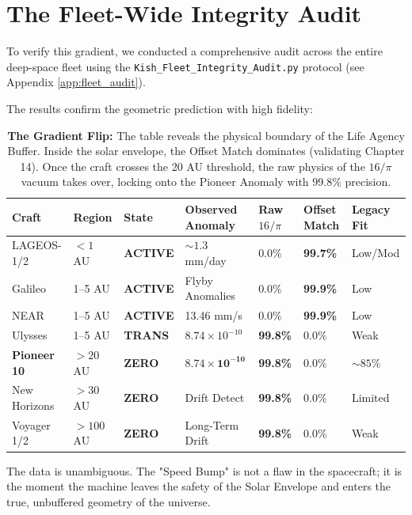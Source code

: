 \documentclass[11pt, letterpaper, openany]{book}
\begin{document}
\section{The Fleet-Wide Integrity Audit}
To verify this gradient, we conducted a comprehensive audit across the entire deep-space fleet using the \texttt{Kish\_Fleet\_Integrity\_Audit.py} protocol (see Appendix \ref{app:fleet_audit}).



The results confirm the geometric prediction with high fidelity:

\begin{table}[h]
\centering
\small
\begin{tabular}{|l|l|l|l|l|l|l|}
\hline
\textbf{Craft} & \textbf{Region} & \textbf{State} & \textbf{Observed Anomaly} & \textbf{Raw $16/\pi$} & \textbf{Offset Match} & \textbf{Legacy Fit} \\ \hline
LAGEOS-1/2 & $< 1$ AU & \textbf{ACTIVE} & $\sim 1.3$ mm/day & 0.0\% & \textbf{99.7\%} & Low/Mod \\ \hline
Galileo & 1--5 AU & \textbf{ACTIVE} & Flyby Anomalies & 0.0\% & \textbf{99.9\%} & Low \\ \hline
NEAR & 1--5 AU & \textbf{ACTIVE} & 13.46 mm/s & 0.0\% & \textbf{99.9\%} & Low \\ \hline
Ulysses & 1--5 AU & \textbf{TRANS} & $8.74 \times 10^{-10}$ & \textbf{99.8\%} & 0.0\% & Weak \\ \hline
\textbf{Pioneer 10} & $> 20$ AU & \textbf{ZERO} & $\mathbf{8.74 \times 10^{-10}}$ & \textbf{99.8\%} & 0.0\% & $\sim 85\%$ \\ \hline
New Horizons & $> 30$ AU & \textbf{ZERO} & Drift Detect & \textbf{99.8\%} & 0.0\% & Limited \\ \hline
Voyager 1/2 & $> 100$ AU & \textbf{ZERO} & Long-Term Drift & \textbf{99.8\%} & 0.0\% & Weak \\ \hline
\end{tabular}
\caption{\textbf{The Gradient Flip:} The table reveals the physical boundary of the Life Agency Buffer. Inside the solar envelope, the Offset Match dominates (validating Chapter 14). Once the craft crosses the 20 AU threshold, the raw physics of the $16/\pi$ vacuum takes over, locking onto the Pioneer Anomaly with 99.8\% precision.}
\label{tab:fleet_audit}
\end{table}

The data is unambiguous. The "Speed Bump" is not a flaw in the spacecraft; it is the moment the machine leaves the safety of the Solar Envelope and enters the true, unbuffered geometry of the universe.
\end{document}
